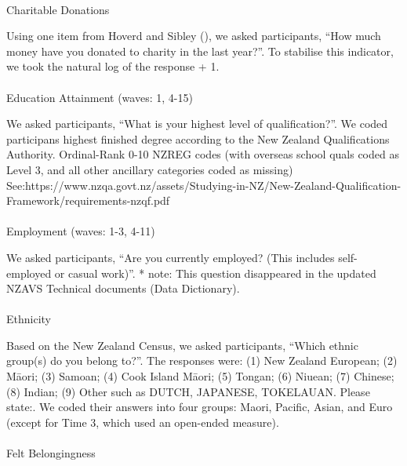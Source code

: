 \documentclass[
  singlecolumn]{article}
\makeatletter
\let\oldparagraph\paragraph
\renewcommand{\paragraph}{
    \@ifstar
      \xxxParagraphStar
      \xxxParagraphNoStar
  }
\newcommand{\xxxParagraphStar}[1]{\oldparagraph*{#1}\mbox{}}
\newcommand{\xxxParagraphNoStar}[1]{\oldparagraph{#1}\mbox{}}
\makeatother
\begin{document}
\paragraph{Charitable Donations}\label{charitable-donations}

Using one item from Hoverd and Sibley
(), we asked participants,
``How much money have you donated to charity in the last year?''. To
stabilise this indicator, we took the natural log of the response + 1.

\paragraph{Education Attainment (waves: 1,
4-15)}\label{education-attainment-waves-1-4-15}

We asked participants, ``What is your highest level of qualification?''.
We coded participans highest finished degree according to the New
Zealand Qualifications Authority. Ordinal-Rank 0-10 NZREG codes (with
overseas school quals coded as Level 3, and all other ancillary
categories coded as missing)
See:https://www.nzqa.govt.nz/assets/Studying-in-NZ/New-Zealand-Qualification-Framework/requirements-nzqf.pdf

\paragraph{Employment (waves: 1-3,
4-11)}\label{employment-waves-1-3-4-11}

We asked participants, ``Are you currently employed? (This includes
self-employed or casual work)''. * note: This question disappeared in
the updated NZAVS Technical documents (Data Dictionary).

\paragraph{Ethnicity}\label{ethnicity}

Based on the New Zealand Census, we asked participants, ``Which ethnic
group(s) do you belong to?''. The responses were: (1) New Zealand
European; (2) Māori; (3) Samoan; (4) Cook Island Māori; (5) Tongan; (6)
Niuean; (7) Chinese; (8) Indian; (9) Other such as DUTCH, JAPANESE,
TOKELAUAN. Please state:. We coded their answers into four groups:
Maori, Pacific, Asian, and Euro (except for Time 3, which used an
open-ended measure).

\paragraph{Felt Belongingness}\label{felt-belongingness}
\end{document}
